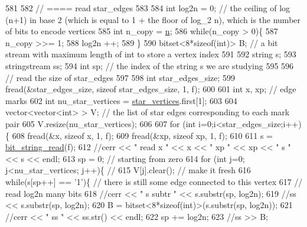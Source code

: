 \begin{DoxyCode}
581 
582   \textcolor{comment}{// ==== read star\_edges}
583 
584   \textcolor{keywordtype}{int} log2n = 0; \textcolor{comment}{// the ceiling of log (n+1) in base 2 (which is equal to 1 + the floor of log\_2 n), which
       is the number of bits to encode vertices}
585   \textcolor{keywordtype}{int} n\_copy = \hyperlink{classmarked__graph__compressed_a8d841016ddb11cfd33748c8deb6277ba}{n};
586   \textcolor{keywordflow}{while}(n\_copy > 0)\{
587     n\_copy >>= 1;
588     log2n ++;
589   \}
590   bitset<8*sizeof(int)> B; \textcolor{comment}{// a bit stream with maximum length of int to store a vertex index}
591 
592   \textcolor{keywordtype}{string} s;
593   stringstream ss;
594   \textcolor{keywordtype}{int} sp; \textcolor{comment}{// the index of the string s we are studying }
595 
596   \textcolor{comment}{// read the size of star\_edges}
597 
598   \textcolor{keywordtype}{int} star\_edges\_size;
599   fread(&star\_edges\_size, \textcolor{keyword}{sizeof} star\_edges\_size, 1, f);
600 
601   \textcolor{keywordtype}{int} x, xp; \textcolor{comment}{// edge marks}
602   \textcolor{keywordtype}{int} nu\_star\_vertices = \hyperlink{classmarked__graph__compressed_a7a4ced4586e2e353f9076bd447df5208}{star\_vertices}.first[1];
603 
604   vector<vector<int> > V; \textcolor{comment}{// the list of star edges corresponding to each mark pair}
605   V.resize(nu\_star\_vertices);
606 
607   \textcolor{keywordflow}{for} (\textcolor{keywordtype}{int} i=0;i<star\_edges\_size;i++)\{
608     fread(&x, \textcolor{keyword}{sizeof} x, 1, f);
609     fread(&xp, \textcolor{keyword}{sizeof} xp, 1, f);
610   
611     s = \hyperlink{compression__helper_8cpp_a40e8dcbc036f96b28e003e882c4890b7}{bit\_string\_read}(f);
612     \textcolor{comment}{//cerr << " read  x " << x << " xp " << xp << " s " << s << endl;}
613     sp = 0; \textcolor{comment}{// starting from zero }
614     \textcolor{keywordflow}{for} (\textcolor{keywordtype}{int} j=0; j<nu\_star\_vertices; j++)\{ \textcolor{comment}{// }
615       V[j].clear(); \textcolor{comment}{// make it fresh}
616       \textcolor{keywordflow}{while}(s[sp++] == \textcolor{charliteral}{'1'})\{ \textcolor{comment}{// there is still some edge connected to this vertex }
617         \textcolor{comment}{// read log2n many bits}
618         \textcolor{comment}{//cerr << " s subtr " << s.substr(sp, log2n);}
619         \textcolor{comment}{//ss << s.substr(sp, log2n);}
620         B = bitset<8*sizeof(int)>(s.substr(sp, log2n));
621         \textcolor{comment}{//cerr << " ss " << ss.str() << endl;}
622         sp += log2n;
623         \textcolor{comment}{//ss >> B;}

\end{DoxyCode}
